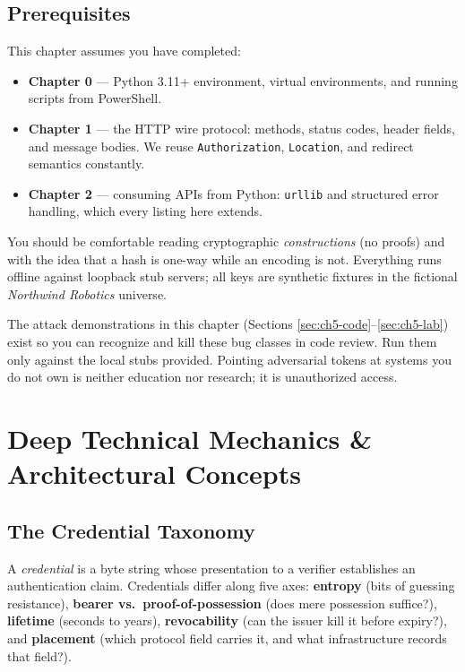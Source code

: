 \subsection*{Prerequisites}
This chapter assumes you have completed:

\begin{itemize}
  \item \textbf{Chapter 0} --- Python 3.11+ environment, virtual environments,
        and running scripts from PowerShell.
  \item \textbf{Chapter 1} --- the HTTP wire protocol: methods, status codes,
        header fields, and message bodies. We reuse \texttt{Authorization},
        \texttt{Location}, and redirect semantics constantly.
  \item \textbf{Chapter 2} --- consuming APIs from Python: \texttt{urllib}
        and structured error handling, which every listing here extends.
\end{itemize}

You should be comfortable reading cryptographic \emph{constructions} (no
proofs) and with the idea that a hash is one-way while an encoding is not.
Everything runs offline against loopback stub servers; all keys are
synthetic fixtures in the fictional \emph{Northwind Robotics} universe.

\begin{warningbox}
The attack demonstrations in this chapter (Sections
\ref{sec:ch5-code}--\ref{sec:ch5-lab}) exist so you can recognize and kill
these bug classes in code review. Run them only against the local stubs
provided. Pointing adversarial tokens at systems you do not own is neither
education nor research; it is unauthorized access.
\end{warningbox}

\section{Deep Technical Mechanics \& Architectural Concepts}
\label{sec:ch5-mechanics}

\subsection{The Credential Taxonomy}
\label{sec:ch5-taxonomy}

\begin{definition}[Credential]
A \emph{credential} is a byte string whose presentation to a verifier
establishes an authentication claim. Credentials differ along five axes:
\textbf{entropy} (bits of guessing resistance), \textbf{bearer vs.\
proof-of-possession} (does mere possession suffice?), \textbf{lifetime}
(seconds to years), \textbf{revocability} (can the issuer kill it before
expiry?), and \textbf{placement} (which protocol field carries it, and what
infrastructure records that field?).
\end{definition}


